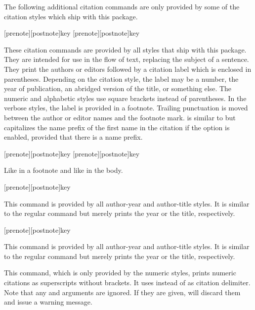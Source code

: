 \documentclass{ltxdockit}[2011/03/25]
\begin{document}
The following additional citation commands are only provided by some of the citation styles which ship with this package.

\begin{ltxsyntax}

[prenote][postnote]{key}
[prenote][postnote]{key}

These citation commands are provided by all styles that ship with this package. They are intended for use in the flow of text, replacing the subject of a sentence. They print the authors or editors followed by a citation label which is enclosed in parentheses. Depending on the citation style, the label may be a number, the year of publication, an abridged version of the title, or something else. The numeric and alphabetic styles use square brackets instead of parentheses. In the verbose styles, the label is provided in a footnote. Trailing punctuation is moved between the author or editor names and the footnote mark.  is similar to  but capitalizes the name prefix of the first name in the citation if the  option is enabled, provided that there is a name prefix.

[prenote][postnote]{key}
[prenote][postnote]{key}

Like  in a footnote and like  in the body.

[prenote][postnote]{key}

This command is provided by all author-year and author-title styles. It is similar to the regular  command but merely prints the year or the title, respectively.

[prenote][postnote]{key}

This command is provided by all author-year and author-title styles. It is similar to the regular  command but merely prints the year or the title, respectively.


This command, which is only provided by the numeric styles, prints numeric citations as superscripts without brackets. It uses  instead of  as citation delimiter. Note that any  and  arguments are ignored. If they are given,  will discard them and issue a warning message.

\end{ltxsyntax}
\end{document}
